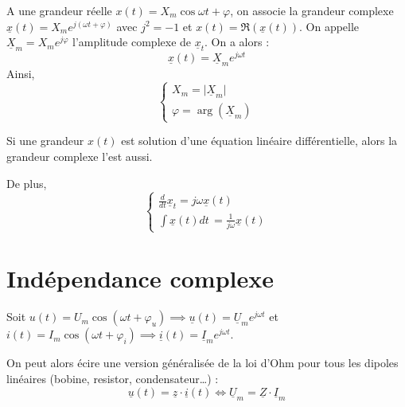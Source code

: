 \begin{lemma}
    A une grandeur réelle \(x(t) = X_{m} \cos \omega t + \varphi\), on associe la grandeur complexe \(\underline{x}(t) = X_{m}e^{ j(\omega t + \varphi) }\) avec \(j^{2} = -1\) et \(x(t) = \Re (\underline{x}(t))\). On appelle \(\underline{X}_{m} = X_{m}e^{ j \varphi }\) l'amplitude complexe de \(\underline{x}_{t}\). On a alors : 
    \[
        \underline{x}(t) = \underline{X}_{m}e^{ j \omega t }
    \]    
    Ainsi, 
    \[
        \begin{cases}
            X_{m} = \lvert \underline{X}_{m} \rvert \\
            \varphi = \arg (\underline{X}_{m})
        \end{cases}
    \]
\end{lemma}

\begin{remark}
    Si une grandeur \(x(t)\) est solution d'une équation linéaire différentielle, alors la grandeur complexe l'est aussi. \par
    De plus,
    \[
        \begin{cases}
            \frac{d}{dt}\underline{x}_{t} = j \omega \underline{x}(t) \\
            \int \underline{x}(t) dt \,  = \frac{1}{j \omega}\underline{x}(t)
        \end{cases}
    \]
\end{remark}

\section{Indépendance complexe}

\begin{theorem}
    Soit \(u(t) = U_{m} \cos (\omega t + \varphi_{u}) \implies \underline{u}(t) = \underline{U}_{m} e^{ j \omega t }\) et \(i(t) = I_{m} \cos (\omega t + \varphi_{i}) \implies \underline{i}(t) = \underline{I}_{m} e^{ j \omega t }\). \par
    On peut alors écire une version généralisée de la loi d'Ohm pour tous les dipoles linéaires (bobine, resistor, condensateur\dots) : 
    \[
        \underline{u}(t) = \underline{z} \cdot \underline{i}(t) \iff \underline{U}_{m} = \underline{Z} \cdot \underline{I}_{m}
    \]
\end{theorem}

